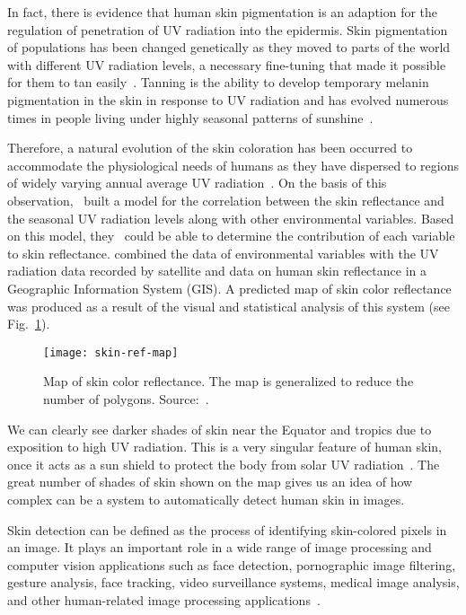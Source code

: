 In fact, there is evidence that human skin pigmentation is an adaption for the regulation of penetration of UV radiation into the epidermis. Skin pigmentation of populations has been changed genetically as they moved to parts of the world with different UV radiation levels, a necessary fine-tuning that made it possible for them to tan easily~\citep{jablonski:00}. Tanning is the ability to develop temporary melanin pigmentation in the skin in response to UV radiation and has evolved numerous times in people living under highly seasonal patterns of sunshine~\citep{jablonski:10}.

Therefore, a natural evolution of the skin coloration has been occurred to accommodate the physiological needs of humans as they have dispersed to regions of widely varying annual average UV radiation~\citep{jablonski:10}. On the basis of this observation,~\citet{chaplin:04} built a model for the correlation between the skin reflectance and the seasonal UV radiation levels along with other environmental variables. Based on this model, they~\citep{chaplin:04} could be able to determine the contribution of each variable to skin reflectance. \citet{chaplin:04} combined the data of environmental variables with the UV radiation data recorded by satellite and data on human skin reflectance in a Geographic Information System (GIS). A predicted map of skin color reflectance was produced as a result of the visual and statistical analysis of this system (see Fig.~\ref{fig:skin-ref-map}).


\begin{figure}[!hb]
  \centering
  \texttt{[image: skin-ref-map]}
  \caption[Map of skin color reflectance]{Map of skin color reflectance. The map is generalized to reduce the number of polygons. Source:~\citet{chaplin:04}.}
  \label{fig:skin-ref-map}
\end{figure}

We can clearly see darker shades of skin near the Equator and tropics due to exposition to high UV radiation. This is a very singular feature of human skin, once it acts as a sun shield to protect the body from solar UV radiation~\citep{jablonski:04}. The great number of shades of skin shown on the map gives us an idea of how complex can be a system to automatically detect human skin in images.

Skin detection can be defined as the process of identifying skin-colored pixels in an image. It plays an important role in a wide range of image processing and computer vision applications such as face detection, pornographic image filtering, gesture analysis, face tracking, video surveillance systems, medical image analysis, and other human-related image processing applications~\citep{kakumanu:07}.


